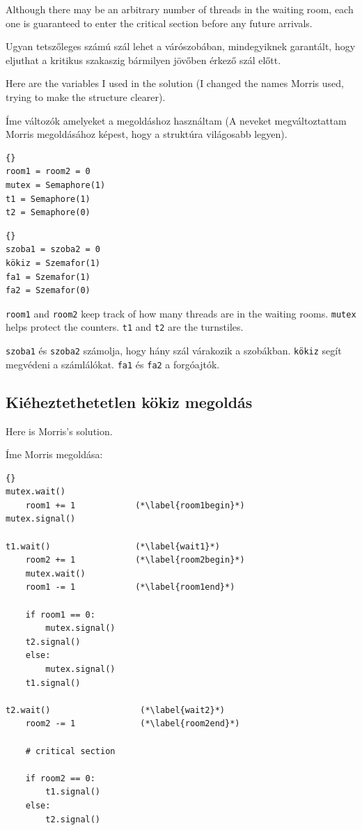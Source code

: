 \documentclass{book}
\newcommand{\clearemptydoublepage}{\newpage\cleardoublepage}
\begin{document}
Although there may be an arbitrary number of threads in the waiting
room, each one is guaranteed to enter the critical section before any
future arrivals.

Ugyan tetszőleges számú szál lehet a várószobában, mindegyiknek garantált,
hogy eljuthat a kritikus szakaszig bármilyen jövőben érkező szál előtt.

Here are the variables I used in the solution (I changed the
names Morris used, trying to make the structure clearer).

Íme változók amelyeket a megoldáshoz használtam (A neveket megváltoztattam
Morris megoldásához képest, hogy a struktúra világosabb legyen). 

\begin{lstlisting}[title={No-starve mutex hint}]{}
room1 = room2 = 0
mutex = Semaphore(1)
t1 = Semaphore(1)
t2 = Semaphore(0)
\end{lstlisting}

\begin{lstlisting}[title={Kiéheztethetetlen kökiz tipp}]{}
szoba1 = szoba2 = 0
kökiz = Szemafor(1)
fa1 = Szemafor(1)
fa2 = Szemafor(0)
\end{lstlisting}

{\tt room1} and {\tt room2} keep track of how many threads are in the
waiting rooms.  {\tt mutex} helps protect the counters.  {\tt t1} and
{\tt t2} are the turnstiles.

{\tt szoba1} és {\tt szoba2} számolja, hogy hány szál várakozik a szobákban.
{\tt kökiz} segít megvédeni a számlálókat. {\tt fa1} és {\tt fa2} a forgóajtók.

\clearemptydoublepage
\subsection{Kiéheztethetetlen kökiz megoldás}

Here is Morris's solution.

Íme Morris megoldása:

\begin{lstlisting}[title={Morris's algorithm}]{}
mutex.wait()
    room1 += 1            (*\label{room1begin}*)
mutex.signal()
                           
t1.wait()                 (*\label{wait1}*)
    room2 += 1            (*\label{room2begin}*)
    mutex.wait()
    room1 -= 1            (*\label{room1end}*)

    if room1 == 0: 
        mutex.signal()
	t2.signal()
    else: 
        mutex.signal()
	t1.signal()

t2.wait()                  (*\label{wait2}*)
    room2 -= 1             (*\label{room2end}*)

    # critical section

    if room2 == 0:
        t1.signal()
    else:
        t2.signal()
\end{lstlisting}
\end{document}
